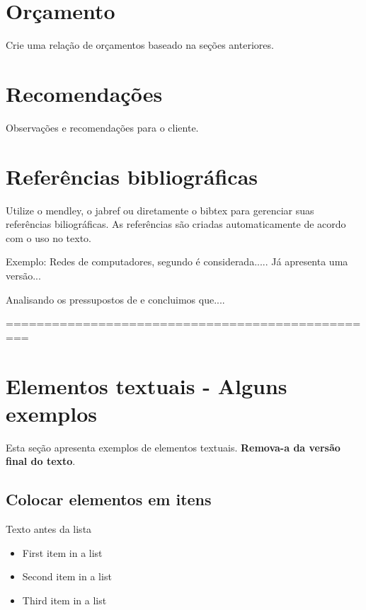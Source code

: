 \documentclass[	DIV=calc,%
							paper=a4,%
							fontsize=12pt,%
							onecolumn]{scrartcl}	 					%
\begin{document}
\section{Orçamento}
Crie uma relação de orçamentos baseado na seções anteriores.

\section{Recomendações}
Observações e recomendações para o cliente.

\section{Referências bibliográficas}
Utilize o mendley, o jabref ou diretamente o bibtex para gerenciar suas referências biliográficas. As referências são criadas automaticamente de acordo com o uso no texto.

Exemplo: Redes de computadores, segundo \cite{t2013} é considerada..... Já \cite{kurose2010} apresenta uma versão...

Analisando os pressupostos de \cite{ref3} e \cite{ref4} concluimos que....


\renewcommand\refname{} %

  

=================================================
\section{Elementos textuais - Alguns exemplos}

Esta seção apresenta exemplos de elementos textuais. \textbf{Remova-a da versão final do texto}.


\subsection{Colocar elementos em itens}

Texto antes da lista

\begin{itemize}
	\item First item in a list 
	\item Second item in a list 
	\item Third item in a list
\end{itemize}
\end{document}
